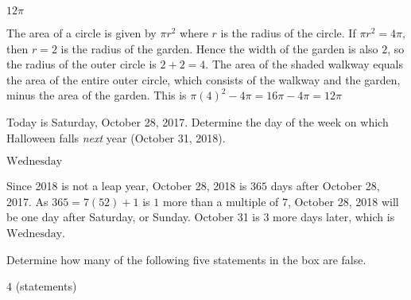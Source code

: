 \documentclass[11pt]{article}
\begin{document}
\begin{answer}
$\boxed{12\pi}$
\end{answer}

\begin{solution}
The area of a circle is given by $\pi r^2$ where $r$ is the radius of the circle.
If $\pi r^2 = 4\pi$, then $r = 2$ is the radius of the garden. Hence the width
of the garden is also $2$, so the radius of the outer circle is $2+2 = 4$.
The area of the shaded walkway equals the area of the entire outer circle,
which consists of the walkway and the garden, minus the area of the garden.
This is $\pi(4)^2 - 4\pi = 16\pi - 4\pi = \boxed{12\pi}$
\end{solution}


\begin{problem}
Today is Saturday, October 28, 2017. Determine the day of the week on which Halloween falls \textit{next} year
(October 31, 2018).
\end{problem}

\begin{answer}
$\boxed{\text{Wednesday}}$
\end{answer}

\begin{solution}
Since 2018 is not a leap year, October 28, 2018 is $365$ days after October 28, 2017. As $365 = 7(52)+1$ is
$1$ more than a multiple of $7$, October 28, 2018 will be one day after Saturday, or Sunday.
October 31 is $3$ more days later, which is $\boxed{\text{Wednesday}}$.
\end{solution}


\begin{problem}%
Determine how many of the following five statements in the box are false.
\begin{center}
\end{center}
\end{problem}

\begin{answer}
$\boxed{4}$ (statements)
\end{answer}
\end{document}
